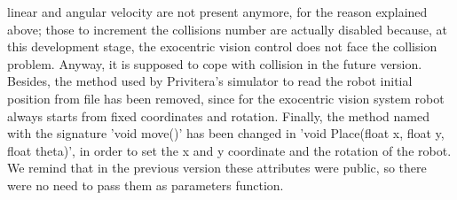 linear and angular velocity are not present anymore, for the reason explained above; those to increment the collisions number are
actually disabled because, at this development stage, the exocentric vision control does not face the collision problem.
Anyway, it is supposed to cope with collision in the future version.
\newline Besides, the method used by Privitera's simulator to read the robot initial position from file has been removed, since for
the exocentric vision system robot always starts from fixed coordinates and rotation.
\newline Finally, the method named with the signature 'void move()' has been changed in 'void Place(float x, float y, float theta)',
in order to set the x and y coordinate and the rotation of the robot. We remind that in the previous version these attributes
were public, so there were no need to pass them as parameters function.
